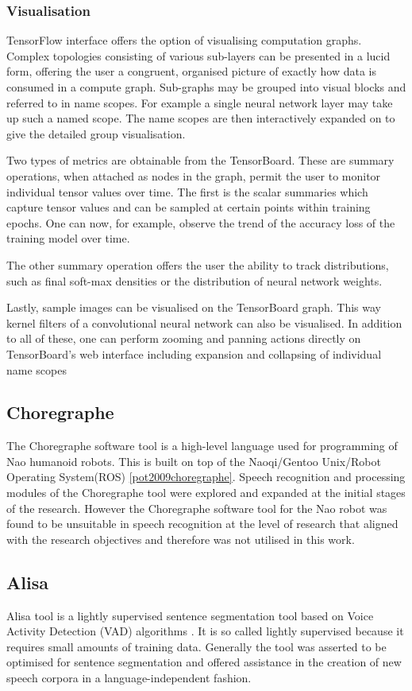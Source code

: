 \subsubsection{Visualisation}
TensorFlow interface offers the option of visualising computation graphs. Complex topologies consisting of various sub-layers can be presented in a lucid form, offering the user a congruent, organised picture of exactly how data is consumed in a compute graph. Sub-graphs may be grouped into visual blocks and referred to in name scopes.  For example a single neural network layer may take up such a named scope. The name scopes are then interactively expanded on to give the detailed group visualisation.

Two types of metrics are obtainable from the TensorBoard. These are summary operations, when attached as nodes in the graph, permit the user to monitor individual tensor values over time.   The first is the scalar summaries which capture tensor values and can be sampled at certain points within training epochs. One can now, for example, observe the trend of the accuracy loss of the training model over time.

The other summary operation offers the user the ability to track distributions, such as final soft-max densities or the distribution of neural network weights. 

Lastly, sample images can be visualised on the TensorBoard graph. This way kernel filters of a convolutional neural network can also be visualised.  In addition to all of these, one can perform zooming and panning actions directly on TensorBoard's web interface including expansion and collapsing of individual name scopes

\subsection{Choregraphe}
The Choregraphe software tool is a high-level language used for programming of Nao humanoid robots.  This is built on top of the Naoqi/Gentoo Unix/Robot Operating System(ROS) \ref{pot2009choregraphe}.  Speech recognition and processing modules of the Choregraphe tool were explored and expanded at the initial stages of the research.  However the Choregraphe software tool for the Nao robot was found to be unsuitable in speech recognition at the level of research that aligned with the research objectives and therefore was not utilised in this work.

\subsection{Alisa}\label{c3sec_alisa}
Alisa tool is a lightly supervised sentence segmentation tool based on Voice Activity Detection (VAD) algorithms \citep{stan2016alisa}.  It is so called lightly supervised because it requires small amounts of training data.  Generally the tool was asserted to be optimised for sentence segmentation and offered assistance in the creation of new speech corpora in a language-independent fashion. 

